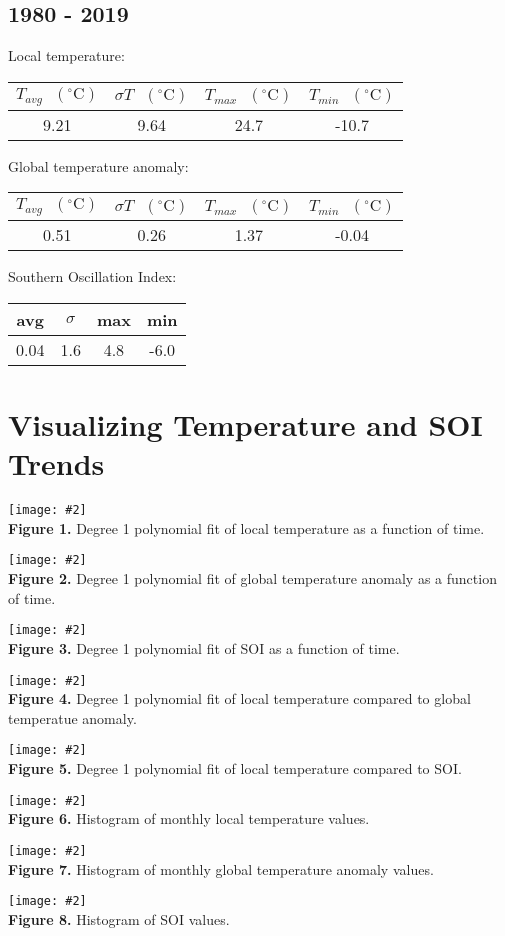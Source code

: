 \documentclass[12pt]{article}
\newcommand{\img}[4]{
 \begin{center}
 \texttt{[image: \#2]} \\
 \textbf{Figure #3.} #4
 \end{center}
}
\begin{document}
\subsection*{1980 - 2019}
Local temperature:
\begin{center}
\begin{tabular}{c | c | c | c}
	$T_{avg} \textrm{ } (^{\circ} \textrm{C})$ &
	$\sigma T \textrm{ } (^{\circ} \textrm{C})$ &
	$T_{max} \textrm{ } (^{\circ} \textrm{C})$ &
	$T_{min} \textrm{ } (^{\circ} \textrm{C})$ \\ %
	\hline
	9.21 & 9.64 & 24.7 & -10.7 \\ %
\end{tabular}
\end{center}
Global temperature anomaly:
\begin{center}
\begin{tabular}{c | c | c | c}
	$T_{avg} \textrm{ } (^{\circ} \textrm{C})$ &
	$\sigma T \textrm{ } (^{\circ} \textrm{C})$ &
	$T_{max} \textrm{ } (^{\circ} \textrm{C})$ &
	$T_{min} \textrm{ } (^{\circ} \textrm{C})$ \\ %
	\hline
	0.51 & 0.26 & 1.37 & -0.04 \\ %
\end{tabular}
\end{center}
Southern Oscillation Index:
\begin{center}
\begin{tabular}{c | c | c | c}
	avg & $\sigma$ & max & min \\ %
	\hline
	0.04 & 1.6 & 4.8 & -6.0 \\ %
\end{tabular}
\end{center}

\section*{Visualizing Temperature and SOI Trends}
\img{0.65}{../plots/fits/local.png}{1}{
	Degree 1 polynomial fit of local temperature as a
	function of time.
}
\img{0.65}{../plots/fits/global.png}{2}{
	Degree 1 polynomial fit of global temperature anomaly as a
	function of time.
}
\img{0.65}{../plots/fits/soi.png}{3}{
	Degree 1 polynomial fit of SOI as a
	function of time.
}
\img{0.65}{../plots/compare/local_vs_global.png}{4}{
	Degree 1 polynomial fit of local temperature compared
	to global temperatue anomaly.
}
\img{0.65}{../plots/compare/local_vs_soi.png}{5}{
	Degree 1 polynomial fit of local temperature compared
	to SOI.
}
\img{0.65}{../plots/histogram/local.png}{6}{
	Histogram of monthly local temperature values.
}
\img{0.65}{../plots/histogram/global.png}{7}{
	Histogram of monthly global temperature anomaly values.
}
\img{0.65}{../plots/histogram/soi.png}{8}{
	Histogram of SOI values.
}
\end{document}

